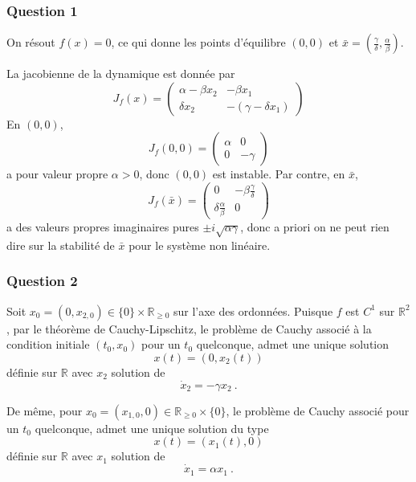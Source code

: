 \hypertarget{answer-cycle-lim-volterra-1}{%
\subsubsection*{Question 1}\label{answer-cycle-lim-volterra-1}}


On résout \(f(x) = 0\), ce qui donne les points d'équilibre \((0,0)\) et
\(\bar{x}=\left(\frac{\gamma}{\delta},\frac{\alpha}{\beta} \right)\).

La jacobienne de la dynamique est donnée par \[
J_f(x) = 
\left(
\begin{matrix}
\alpha -\beta x_2 & -\beta x_1 \\
\delta x_2 & -(\gamma-\delta x_1)
\end{matrix}
\right)
\] En \((0,0)\), \[
J_f(0,0) = 
\left(
\begin{matrix}
\alpha & 0 \\
0 & -\gamma
\end{matrix}
\right)
\] a pour valeur propre \(\alpha>0\), donc \((0,0)\) est instable. Par
contre, en \(\bar{x}\), \[
J_f(\bar{x}) = 
\left(
\begin{matrix}
0 & -\beta\frac{\gamma}{\delta} \\
\delta\frac{\alpha}{\beta} & 0
\end{matrix}
\right)
\] a des valeurs propres imaginaires pures \(\pm i\sqrt{\alpha\gamma}\),
donc a priori on ne peut rien dire sur la stabilité de \(\bar{x}\) pour le système
non linéaire.

\hypertarget{answer-cycle-lim-volterra-2}{%
\subsubsection*{Question 2}\label{answer-cycle-lim-volterra-2}}


Soit \(x_0=(0,x_{2,0})\in \{0\}\times \mathbb{R}_{\geq 0}\) sur l'axe
des ordonnées. Puisque \(f\) est \(C^1\) sur \(\mathbb{R}^2\), par le
théorème de Cauchy-Lipschitz, le problème de Cauchy associé à la
condition initiale \((t_0,x_0)\) pour un \(t_0\) quelconque, admet une
unique solution \[
x(t) = (0, x_2(t))
\] définie sur \(\mathbb{R}\) avec \(x_2\) solution de \[
\dot{x}_2 = -\gamma x_2 \ .
\]

De même, pour \(x_0=(x_{1,0},0)\in \mathbb{R}_{\geq 0}\times \{0\}\), le
problème de Cauchy associé pour un \(t_0\) quelconque, admet une unique
solution du type \[
x(t) = (x_1(t), 0)
\] définie sur \(\mathbb{R}\) avec \(x_1\) solution de \[
\dot{x}_1 = \alpha x_1 \ .
\]

